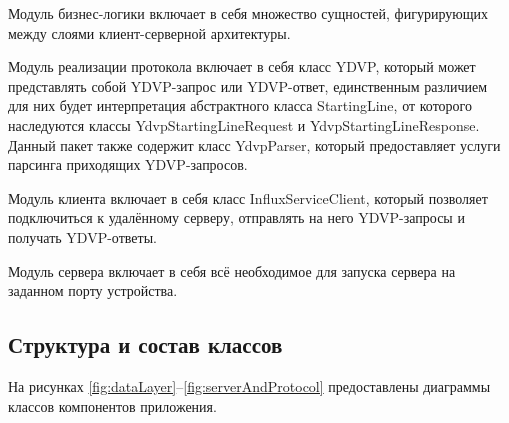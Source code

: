 Модуль бизнес-логики включает в себя множество сущностей, фигурирующих между слоями клиент-серверной архитектуры.

Модуль реализации протокола включает в себя класс YDVP, который может представлять собой YDVP-запрос или YDVP-ответ, единственным различием для них будет интерпретация абстрактного класса StartingLine, от которого наследуются классы YdvpStartingLineRequest и YdvpStartingLineResponse. Данный пакет также содержит класс YdvpParser, который предоставляет услуги парсинга приходящих YDVP-запросов.

Модуль клиента включает в себя класс InfluxServiceClient, который позволяет подключиться к удалённому серверу, отправлять на него YDVP-запросы и получать YDVP-ответы. 

Модуль сервера включает в себя всё необходимое для запуска сервера на заданном порту устройства.

\subsection{Структура и состав классов}
На рисунках \ref{fig:dataLayer}--\ref{fig:serverAndProtocol} предоставлены диаграммы классов компонентов приложения.

